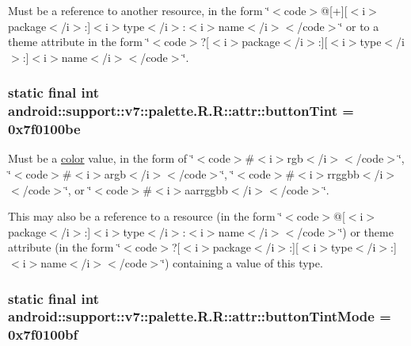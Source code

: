 Must be a reference to another resource, in the form \char`\"{}$<$code$>$@\mbox{[}+\mbox{]}\mbox{[}$<$i$>$package$<$/i$>$:\mbox{]}$<$i$>$type$<$/i$>$:$<$i$>$name$<$/i$>$$<$/code$>$\char`\"{} or to a theme attribute in the form \char`\"{}$<$code$>$?\mbox{[}$<$i$>$package$<$/i$>$:\mbox{]}\mbox{[}$<$i$>$type$<$/i$>$:\mbox{]}$<$i$>$name$<$/i$>$$<$/code$>$\char`\"{}. \hypertarget{classandroid_1_1support_1_1v7_1_1palette_1_1_r_1_1attr_d39bc48718b6e919e721139fd5a49357}{
\subsubsection[{buttonTint}]{\setlength{\rightskip}{0pt plus 5cm}static final int android::support::v7::palette.R.R::attr::buttonTint = 0x7f0100be}}
\label{classandroid_1_1support_1_1v7_1_1palette_1_1_r_1_1attr_d39bc48718b6e919e721139fd5a49357}


Must be a \hyperlink{classandroid_1_1support_1_1v7_1_1palette_1_1_r_1_1color}{color} value, in the form of \char`\"{}$<$code$>$\#$<$i$>$rgb$<$/i$>$$<$/code$>$\char`\"{}, \char`\"{}$<$code$>$\#$<$i$>$argb$<$/i$>$$<$/code$>$\char`\"{}, \char`\"{}$<$code$>$\#$<$i$>$rrggbb$<$/i$>$$<$/code$>$\char`\"{}, or \char`\"{}$<$code$>$\#$<$i$>$aarrggbb$<$/i$>$$<$/code$>$\char`\"{}. 

This may also be a reference to a resource (in the form \char`\"{}$<$code$>$@\mbox{[}$<$i$>$package$<$/i$>$:\mbox{]}$<$i$>$type$<$/i$>$:$<$i$>$name$<$/i$>$$<$/code$>$\char`\"{}) or theme attribute (in the form \char`\"{}$<$code$>$?\mbox{[}$<$i$>$package$<$/i$>$:\mbox{]}\mbox{[}$<$i$>$type$<$/i$>$:\mbox{]}$<$i$>$name$<$/i$>$$<$/code$>$\char`\"{}) containing a value of this type. \hypertarget{classandroid_1_1support_1_1v7_1_1palette_1_1_r_1_1attr_bb9086dd3d97cbddd9c74ec1c65ff96f}{
\subsubsection[{buttonTintMode}]{\setlength{\rightskip}{0pt plus 5cm}static final int android::support::v7::palette.R.R::attr::buttonTintMode = 0x7f0100bf}}
\label{classandroid_1_1support_1_1v7_1_1palette_1_1_r_1_1attr_bb9086dd3d97cbddd9c74ec1c65ff96f}


